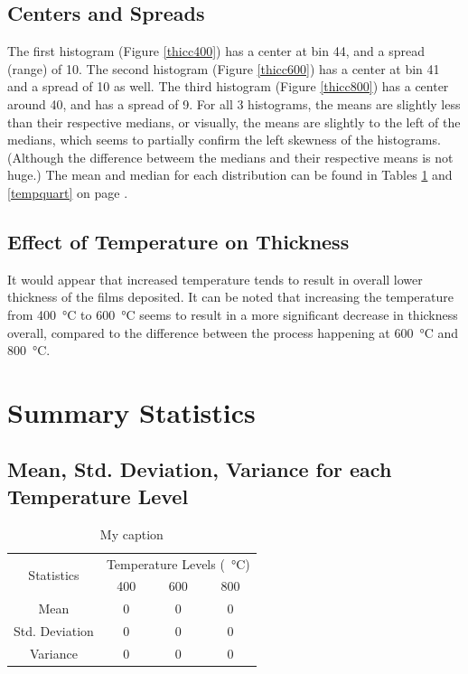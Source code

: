 \documentclass[letterpaper]{article}
\begin{document}
\subsection{Centers and Spreads}
The first histogram (Figure \ref{thicc400}) has a center at bin 44, and a spread
(range) of 10. The second histogram (Figure \ref{thicc600}) has a center at bin
41 and a spread of 10 as well. The third histogram (Figure \ref{thicc800}) has a
center around 40, and has a spread of 9. For all 3 histograms, the means are
slightly less than their respective medians, or visually, the means are slightly
to the left of the medians, which seems to partially confirm the left skewness
of the histograms. (Although the difference betweem the medians and their
respective means is not huge.) The mean and median for each distribution can be
found in Tables \ref{tempmean} and \ref{tempquart} on page \pageref{tempmean}.


\subsection{Effect of Temperature on Thickness}
It would appear that increased temperature tends to result in overall lower
thickness of the films deposited. It can be noted that increasing the
temperature from \SI{400}{\celsius} to \SI{600}{\celsius} seems to result in a
more significant decrease in thickness overall, compared to the difference
between the process happening at \SI{600}{\celsius} and \SI{800}{\celsius}.

\section{Summary Statistics}

\subsection{Mean, Std. Deviation, Variance for each Temperature Level}

\begin{table}[H]
 \centering
 \begin{tabular}{c|c|c|c|}
  \multirow{2}{*}{Statistics} & \multicolumn{3}{c|}{Temperature Levels (\SI{}{\celsius})}             \\ \cline{2-4}
                              & 400                                                       & 600 & 800 \\ \hline
  Mean                        & 0                                                         & 0   & 0   \\ \hline
  Std. Deviation              & 0                                                         & 0   & 0   \\ \hline
  Variance                    & 0                                                         & 0   & 0   \\ \hline
 \end{tabular}
 \caption{My caption}
 \label{tempmean}
\end{table}
\end{document}
